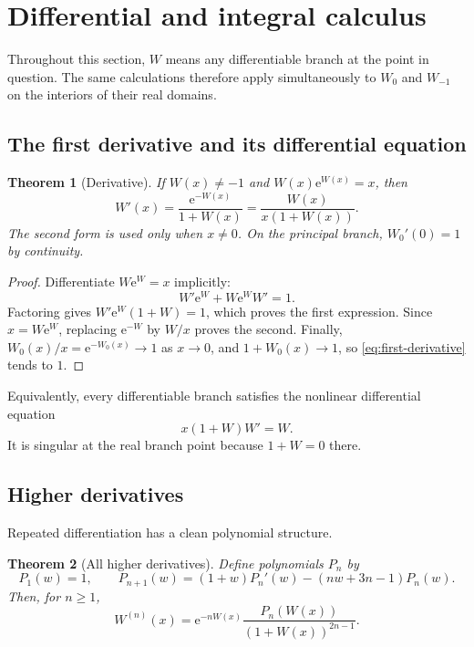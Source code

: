 \documentclass[11pt]{article}
\numberwithin{equation}{section}
\newtheorem{theorem}{Theorem}[section]
\theoremstyle{definition}
\theoremstyle{remark}
\newcommand{\e}{\mathrm e}
\begin{document}
\section{Differential and integral calculus}
\label{sec:calculus}

Throughout this section, $W$ means any differentiable branch at the point in
question.  The same calculations therefore apply simultaneously to $W_0$ and
$W_{-1}$ on the interiors of their real domains.

\subsection{The first derivative and its differential equation}

\begin{theorem}[Derivative]
\label{thm:derivative}
If $W(x)\ne-1$ and $W(x)\e^{W(x)}=x$, then
\begin{equation}
  W'(x)=\frac{\e^{-W(x)}}{1+W(x)}
       =\frac{W(x)}{x(1+W(x))}.                       \label{eq:first-derivative}
\end{equation}
The second form is used only when $x\ne0$.  On the principal branch,
$W_0'(0)=1$ by continuity.
\end{theorem}

\begin{proof}
Differentiate $W\e^W=x$ implicitly:
\[
  W'\e^W+W\e^W W'=1.
\]
Factoring gives $W'\e^W(1+W)=1$, which proves the first expression.  Since
$x=W\e^W$, replacing $\e^{-W}$ by $W/x$ proves the second.  Finally,
$W_0(x)/x=\e^{-W_0(x)}\to1$ as $x\to0$, and
$1+W_0(x)\to1$, so \eqref{eq:first-derivative} tends to $1$.
\end{proof}

Equivalently, every differentiable branch satisfies the nonlinear differential
equation
\begin{equation}
  x(1+W)W'=W.                                          \label{eq:W-ode}
\end{equation}
It is singular at the real branch point because $1+W=0$ there.

\subsection{Higher derivatives}

Repeated differentiation has a clean polynomial structure.

\begin{theorem}[All higher derivatives]
\label{thm:higher-derivatives}
Define polynomials $P_n$ by
\begin{equation}
  P_1(w)=1,
  \qquad
  P_{n+1}(w)=(1+w)P_n'(w)-(nw+3n-1)P_n(w).             \label{eq:P-recurrence}
\end{equation}
Then, for $n\ge1$,
\begin{equation}
  W^{(n)}(x)=\e^{-nW(x)}
      \frac{P_n(W(x))}{(1+W(x))^{2n-1}}.              \label{eq:nth-derivative}
\end{equation}
\end{theorem}
\end{document}
